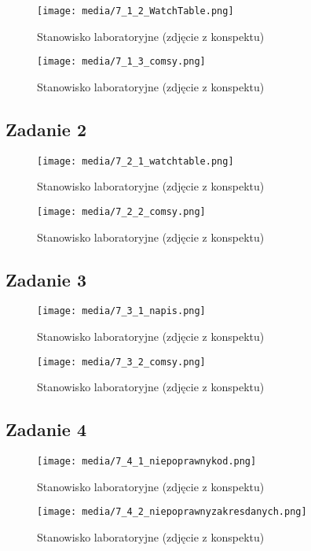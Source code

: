 \documentclass{article}
\begin{document}
\begin{figure}[H]
    \centering
    \texttt{[image: media/7\_1\_2\_WatchTable.png]}
    \caption{Stanowisko laboratoryjne (zdjęcie z konspektu)}
    \label{fig:zdj17}
\end{figure}


\begin{figure}[H]
    \centering
    \texttt{[image: media/7\_1\_3\_comsy.png]}
    \caption{Stanowisko laboratoryjne (zdjęcie z konspektu)}
    \label{fig:zdj18}
\end{figure}

\subsection{Zadanie 2}


\begin{figure}[H]
    \centering
    \texttt{[image: media/7\_2\_1\_watchtable.png]}
    \caption{Stanowisko laboratoryjne (zdjęcie z konspektu)}
    \label{fig:zdj19}
\end{figure}


\begin{figure}[H]
    \centering
    \texttt{[image: media/7\_2\_2\_comsy.png]}
    \caption{Stanowisko laboratoryjne (zdjęcie z konspektu)}
    \label{fig:zdj20}
\end{figure}


\subsection{Zadanie 3}


\begin{figure}[H]
    \centering
    \texttt{[image: media/7\_3\_1\_napis.png]}
    \caption{Stanowisko laboratoryjne (zdjęcie z konspektu)}
    \label{fig:zdj21}
\end{figure}


\begin{figure}[H]
    \centering
    \texttt{[image: media/7\_3\_2\_comsy.png]}
    \caption{Stanowisko laboratoryjne (zdjęcie z konspektu)}
    \label{fig:zdj22}
\end{figure}


\subsection{Zadanie 4}


\begin{figure}[H]
    \centering
    \texttt{[image: media/7\_4\_1\_niepoprawnykod.png]}
    \caption{Stanowisko laboratoryjne (zdjęcie z konspektu)}
    \label{fig:zdj23}
\end{figure}


\begin{figure}[H]
    \centering
    \texttt{[image: media/7\_4\_2\_niepoprawnyzakresdanych.png]}
    \caption{Stanowisko laboratoryjne (zdjęcie z konspektu)}
    \label{fig:zdj24}
\end{figure}
\end{document}
